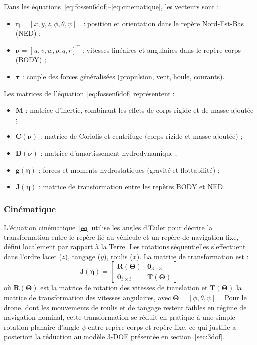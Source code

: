 \documentclass{rapportEILCO}
\begin{document}
	Dans les équations~\eqref{eq:fossen6dof}--\eqref{eq:cinematique}, les vecteurs sont :
	\begin{itemize}[label=--]
		\item $\boldsymbol{\eta} = [x, y, z, \phi, \theta, \psi]^\top$ : position et orientation dans le
		repère Nord-Est-Bas (NED) ;
		\item $\boldsymbol{\nu} = [u, v, w, p, q, r]^\top$ : vitesses linéaires et angulaires dans le
		repère corps (BODY) ;
		\item $\boldsymbol{\tau}$ : couple des forces généralisées (propulsion, vent, houle, courants).
	\end{itemize}
	
	Les matrices de l'équation~\eqref{eq:fossen6dof} représentent :
	\begin{itemize}[label=--]
		\item $\boldsymbol{M}$ : matrice d'inertie, combinant les effets de corps rigide et de masse
		ajoutée ;
		\item $\boldsymbol{C}(\boldsymbol{\nu})$ : matrice de Coriolis et centrifuge (corps rigide et
		masse ajoutée) ;
		\item $\boldsymbol{D}(\boldsymbol{\nu})$ : matrice d'amortissement hydrodynamique ;
		\item $\boldsymbol{g}(\boldsymbol{\eta})$ : forces et moments hydrostatiques (gravité et
		flottabilité) ;
		\item $\boldsymbol{J}(\boldsymbol{\eta})$ : matrice de transformation entre les repères BODY et NED.
	\end{itemize}
	
	\subsubsection{Cinématique}
	
	L'équation cinématique~\eqref{eq} utilise les angles d'Euler pour décrire la transformation entre le repère lié au véhicule et un repère de navigation fixe, défini localement par rapport à la Terre. Les rotations
	séquentielles s'effectuent dans l'ordre lacet ($z$), tangage ($y$), roulis ($x$). La matrice de
	transformation est :
	\begin{equation}
		\boldsymbol{J}(\boldsymbol{\eta}) =
		\begin{bmatrix}
			\boldsymbol{R}(\boldsymbol{\Theta}) & \boldsymbol{0}_{3\times3} \\
			\boldsymbol{0}_{3\times3} & \boldsymbol{T}(\boldsymbol{\Theta})
		\end{bmatrix}
		\label{eq:J}
	\end{equation}
	où $\boldsymbol{R}(\boldsymbol{\Theta})$ est la matrice de rotation des vitesses de translation et
	$\boldsymbol{T}(\boldsymbol{\Theta})$ la matrice de transformation des vitesses angulaires, avec
	$\boldsymbol{\Theta} = [\phi, \theta, \psi]^\top$. Pour le drone, dont les mouvements de roulis et de
	tangage restent faibles en régime de navigation nominal, cette transformation se réduit en pratique à
	une simple rotation planaire d'angle $\psi$ entre repère corps et repère fixe, ce qui justifie a
	posteriori la réduction au modèle 3-DOF présentée en section~\ref{sec:3dof}.
	
\end{document}
